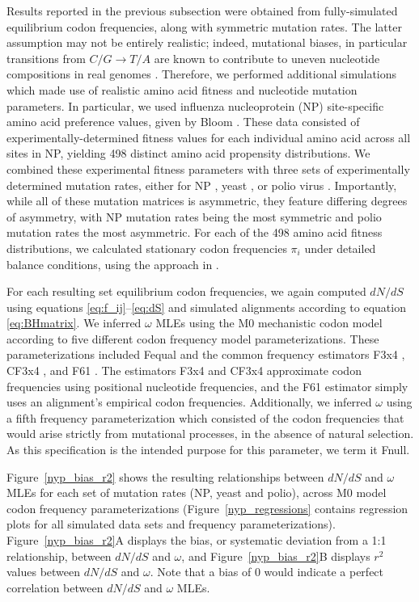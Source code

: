 \documentclass[11pt]{article}
\begin{document}
Results reported in the previous subsection were obtained from fully-simulated equilibrium codon frequencies, along with symmetric mutation rates. The latter assumption may not be entirely realistic; indeed, mutational biases, in particular transitions from $C/G \rightarrow T/A$ are known to contribute to uneven nucleotide compositions in real genomes \cite{Hernandez2007,HershbergPetrov2010,Zhu2014,Acevedo2014}. Therefore, we performed additional simulations which made use of realistic amino acid fitness and nucleotide mutation parameters.  In particular, we used influenza nucleoprotein (NP) site-specific amino acid preference values, given by Bloom \cite{Bloom2014a}. These data consisted of experimentally-determined fitness values for each individual amino acid across all sites in NP, yielding 498 distinct amino acid propensity distributions. We combined these experimental fitness parameters with three sets of experimentally determined mutation rates, either for NP \cite{Bloom2014a}, yeast \cite{Zhu2014}, or polio virus \cite{Acevedo2014}. Importantly, while all of these mutation matrices is asymmetric, they feature differing degrees of asymmetry, with NP mutation rates being the most symmetric and polio mutation rates the most asymmetric. For each of the 498 amino acid fitness distributions, we calculated stationary codon frequencies $\pi_i$ under detailed balance conditions, using the approach in \cite{Bloom2014a,Bloom2014b}. 

For each resulting set equilibrium codon frequencies, we again computed $dN/dS$ using equations \eqref{eq:f_ij}--\eqref{eq:dS} and simulated alignments according to equation \eqref{eq:BHmatrix}. We inferred $\omega$ MLEs using the M0 mechanistic codon model  according to five different codon frequency model parameterizations. These parameterizations included Fequal \cite{Yang2006} and the common frequency estimators F3x4 \cite{MuseGaut1994}, CF3x4 \cite{Pond2010}, and F61 \cite{GoldmanYang1994}. The estimators F3x4 and CF3x4 approximate codon frequencies using positional nucleotide frequencies, and the F61 estimator simply uses an alignment's empirical codon frequencies. Additionally, we inferred $\omega$ using a fifth frequency parameterization which consisted of the codon frequencies that would arise strictly from mutational processes, in the absence of natural selection. As this specification is the intended purpose for this parameter, we term it Fnull.


Figure~\ref{nyp_bias_r2} shows the resulting relationships between $dN/dS$ and $\omega$ MLEs for each set of mutation rates (NP, yeast and polio), across M0 model codon frequency parameterizations (Figure~\ref{nyp_regressions} contains regression plots for all simulated data sets and frequency parameterizations). Figure~\ref{nyp_bias_r2}A displays the bias, or systematic deviation from a 1:1 relationship, between $dN/dS$ and $\omega$, and Figure~\ref{nyp_bias_r2}B displays $r^2$ values between $dN/dS$ and $\omega$. Note that a bias of 0 would indicate a perfect correlation between $dN/dS$ and $\omega$ MLEs.
\end{document}
